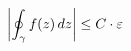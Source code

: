\documentclass[preview]{standalone}
\begin{document}
\begin{align*}
\special{dvisvgm:raw <g id='unique000'>}\left| \oint_{\gamma} f(z)\, dz \right| \le C \cdot \varepsilon\special{dvisvgm:raw </g>}
\end{align*}
\end{document}
